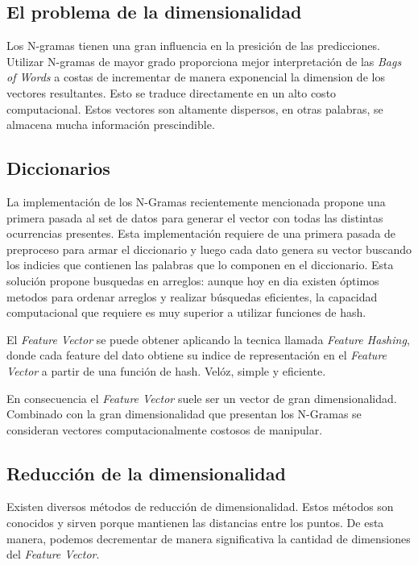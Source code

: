 \documentclass[a4paper,10pt]{article}
\begin{document}
	\subsection{El problema de la dimensionalidad}
	Los N-gramas tienen una gran influencia en la presici\'{o}n de las predicciones. Utilizar N-gramas de mayor grado proporciona mejor interpretaci\'{o}n de las \textit{Bags of Words} a costas de incrementar de manera exponencial la dimension de los vectores resultantes. Esto se traduce directamente en un alto costo computacional. Estos vectores son altamente dispersos, en otras palabras, se almacena mucha informaci\'{o}n prescindible.
	
	\subsection{Diccionarios}
	La implementaci\'{o}n de los N-Gramas recientemente mencionada propone una primera pasada al set de datos para generar el vector con todas las distintas ocurrencias presentes. Esta implementaci\'{o}n requiere de una primera pasada de preproceso para armar el diccionario y luego cada dato genera su vector buscando los indicies que contienen las palabras que lo componen en el diccionario. Esta soluci\'{o}n propone busquedas en arreglos: aunque hoy en dia existen \'{o}ptimos metodos para ordenar arreglos y realizar b\'{u}squedas eficientes, la capacidad computacional que requiere es muy superior a utilizar funciones de hash.
	
	El \textit{Feature Vector} se puede obtener aplicando la tecnica llamada \textit{Feature Hashing}, donde cada feature del dato obtiene su indice de representaci\'{o}n en el \textit{Feature Vector} a partir de una funci\'{o}n de hash. Vel\'{o}z, simple y eficiente.
	
	En consecuencia el \textit{Feature Vector} suele ser un vector de gran dimensionalidad. Combinado con la gran dimensionalidad que presentan los N-Gramas se consideran vectores computacionalmente costosos de manipular.
	
	\subsection{Reducci\'{o}n de la dimensionalidad}
	
	Existen diversos m\'{e}todos de reducci\'{o}n de dimensionalidad. Estos m\'{e}todos son conocidos y sirven porque mantienen las distancias entre los puntos. De esta manera, podemos decrementar de manera significativa la cantidad de dimensiones del \textit{Feature Vector}.
	
\end{document}
